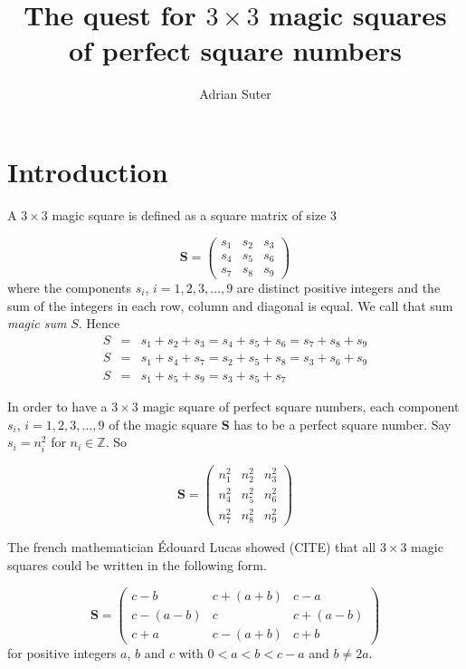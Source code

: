 \documentclass[reqno,10pt,a4paper]{article}
\title{The quest for $3 \times 3$ magic squares of perfect square numbers}
\author{Adrian Suter}
\begin{document}
	
	\maketitle
	
	\section{Introduction}
		
	A $3 \times 3$ magic square is defined as a square matrix of size $3$
	
	\begin{equation}
		\mathbf{S} = 
		\begin{pmatrix}
		s_1 & s_2 & s_3 \\
		s_4 & s_5 & s_6 \\
		s_7 & s_8 & s_9
		\end{pmatrix}
	\end{equation}
	where the components $s_i$, $i = 1, 2, 3, \ldots, 9$ are distinct positive integers and the sum of the integers in each row, column and diagonal is equal. We call that sum \emph{magic sum} $S$. Hence
	\begin{eqnarray}
		S &=& s_1 + s_2 + s_3 = s_4 + s_5 + s_6 = s_7 + s_8 + s_9 \\
		S &=& s_1 + s_4 + s_7 = s_2 + s_5 + s_8 = s_3 + s_6 + s_9 \\
		S &=& s_1 + s_5 + s_9 = s_3 + s_5 + s_7
	\end{eqnarray}
	
		
	In order to have a $3 \times 3$ magic square of perfect square numbers, each component $s_i$, $i = 1, 2, 3, \ldots, 9$ of the magic square $\mathbf{S}$ has to be a perfect square number. Say $s_i = n_i^2$ for $n_i \in \mathbb{Z}$. So
	
	\begingroup
	\renewcommand*{\arraystretch}{1.5}
	\begin{equation}
		\mathbf{S} = 
		\begin{pmatrix}
			n_1^2 & n_2^2 & n_3^2 \\
			n_4^2 & n_5^2 & n_6^2 \\
			n_7^2 & n_8^2 & n_9^2
		\end{pmatrix}
	\end{equation}
	\endgroup	
	
	
	The french mathematician \'{E}douard Lucas showed (CITE) that all $3 \times 3$ magic squares could be written in the following form.
	
	\begin{equation}
	\mathbf{S} = 
	\begin{pmatrix}
	c - b & c + (a + b) & c - a \\
	c - (a - b) & c & c + (a - b) \\
	c + a & c - (a + b) & c + b
	\end{pmatrix}
	\end{equation}
	for positive integers $a$, $b$ and $c$ with $0 < a < b < c - a$ and $b \neq 2a$.
	
\end{document}
